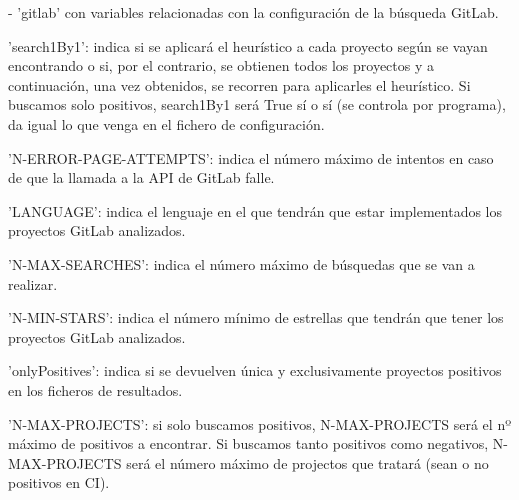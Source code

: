 - 'gitlab' con variables relacionadas con la configuración de la búsqueda GitLab.
\begin{compactitem}
    \item 'search1By1': indica si se aplicará el heurístico a cada proyecto según se vayan encontrando o si, por el contrario, se obtienen todos los proyectos y a continuación, una vez obtenidos, se recorren para aplicarles el heurístico. Si buscamos solo positivos, search1By1 será True sí o sí (se controla por programa), da igual lo que venga en el fichero de configuración.
    \item 'N-ERROR-PAGE-ATTEMPTS': indica el número máximo de intentos en caso de que la llamada a la API de GitLab falle.
    \item 'LANGUAGE': indica el lenguaje en el que tendrán que estar implementados los proyectos GitLab analizados.
    \item 'N-MAX-SEARCHES': indica el número máximo de búsquedas que se van a realizar.
    \item 'N-MIN-STARS': indica el número mínimo de estrellas que tendrán que tener los proyectos GitLab analizados.
    \item 'onlyPositives': indica si se devuelven única y exclusivamente proyectos positivos en los ficheros de resultados.
    \item 'N-MAX-PROJECTS': si solo buscamos positivos, N-MAX-PROJECTS será el nº máximo de positivos a encontrar. Si buscamos tanto positivos como negativos, N-MAX-PROJECTS será el número máximo de projectos que tratará (sean o no positivos en CI).
\end{compactitem}

